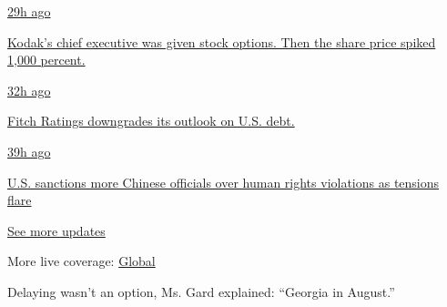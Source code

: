 \href{https://www.nytimes.com/live/2020/07/31/business/stock-market-today-coronavirus?action=click\&pgtype=Article\&state=default\&region=MAIN_CONTENT_1\&context=storylines_live_updates\#kodaks-chief-executive-was-given-stock-options-then-the-share-price-spiked-1000-percent}{29h
ago}

\href{https://www.nytimes.com/live/2020/07/31/business/stock-market-today-coronavirus?action=click\&pgtype=Article\&state=default\&region=MAIN_CONTENT_1\&context=storylines_live_updates\#kodaks-chief-executive-was-given-stock-options-then-the-share-price-spiked-1000-percent}{Kodak's
chief executive was given stock options. Then the share price spiked
1,000 percent.}

\href{https://www.nytimes.com/live/2020/07/31/business/stock-market-today-coronavirus?action=click\&pgtype=Article\&state=default\&region=MAIN_CONTENT_1\&context=storylines_live_updates\#fitch-ratings-downgrades-its-outlook-on-us-debt}{32h
ago}

\href{https://www.nytimes.com/live/2020/07/31/business/stock-market-today-coronavirus?action=click\&pgtype=Article\&state=default\&region=MAIN_CONTENT_1\&context=storylines_live_updates\#fitch-ratings-downgrades-its-outlook-on-us-debt}{Fitch
Ratings downgrades its outlook on U.S. debt.}

\href{https://www.nytimes.com/live/2020/07/31/business/stock-market-today-coronavirus?action=click\&pgtype=Article\&state=default\&region=MAIN_CONTENT_1\&context=storylines_live_updates\#us-sanctions-more-chinese-officials-over-human-rights-violations-as-tensions-flare}{39h
ago}

\href{https://www.nytimes.com/live/2020/07/31/business/stock-market-today-coronavirus?action=click\&pgtype=Article\&state=default\&region=MAIN_CONTENT_1\&context=storylines_live_updates\#us-sanctions-more-chinese-officials-over-human-rights-violations-as-tensions-flare}{U.S.
sanctions more Chinese officials over human rights violations as
tensions flare}

\href{https://www.nytimes.com/live/2020/07/31/business/stock-market-today-coronavirus?action=click\&pgtype=Article\&state=default\&region=MAIN_CONTENT_1\&context=storylines_live_updates}{See
more updates}

More live coverage:
\href{https://www.nytimes.com/2020/08/01/world/coronavirus-covid-19.html?action=click\&pgtype=Article\&state=default\&region=MAIN_CONTENT_1\&context=storylines_live_updates}{Global}

Delaying wasn't an option, Ms. Gard explained: ``Georgia in August.''

